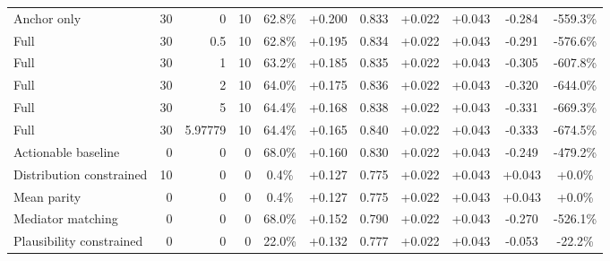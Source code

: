 \begin{table}[htbp]
\begin{tabular}{lrrrccccccc}
Anchor only & 30 & 0 & 10 & 62.8\% & +0.200 & 0.833 & +0.022 & +0.043 & -0.284 & -559.3\% \\
Full & 30 & 0.5 & 10 & 62.8\% & +0.195 & 0.834 & +0.022 & +0.043 & -0.291 & -576.6\% \\
Full & 30 & 1 & 10 & 63.2\% & +0.185 & 0.835 & +0.022 & +0.043 & -0.305 & -607.8\% \\
Full & 30 & 2 & 10 & 64.0\% & +0.175 & 0.836 & +0.022 & +0.043 & -0.320 & -644.0\% \\
Full & 30 & 5 & 10 & 64.4\% & +0.168 & 0.838 & +0.022 & +0.043 & -0.331 & -669.3\% \\
Full & 30 & 5.97779 & 10 & 64.4\% & +0.165 & 0.840 & +0.022 & +0.043 & -0.333 & -674.5\% \\
Actionable baseline & 0 & 0 & 0 & 68.0\% & +0.160 & 0.830 & +0.022 & +0.043 & -0.249 & -479.2\% \\
Distribution constrained & 10 & 0 & 0 & 0.4\% & +0.127 & 0.775 & +0.022 & +0.043 & +0.043 & +0.0\% \\
Mean parity & 0 & 0 & 0 & 0.4\% & +0.127 & 0.775 & +0.022 & +0.043 & +0.043 & +0.0\% \\
Mediator matching & 0 & 0 & 0 & 68.0\% & +0.152 & 0.790 & +0.022 & +0.043 & -0.270 & -526.1\% \\
Plausibility constrained & 0 & 0 & 0 & 22.0\% & +0.132 & 0.777 & +0.022 & +0.043 & -0.053 & -22.2\% \\
\bottomrule
\end{tabular}
\end{table}